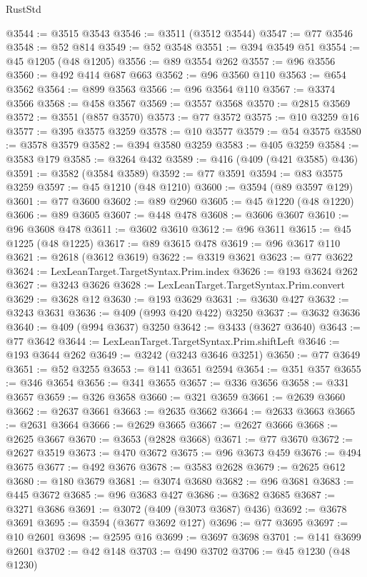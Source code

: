 \begin{lexlean}{RustStd}
\begin{coremodule}
{\begin{coremodule}
{{{{{{{{{{{{{{{{{{{{{{{{{{{{{{{{{{{{{{{{{{{{{{{{{{{{{{{{{{{{@3544 := @3515 @3543
@3546 := @3511 (@3512 @3544)
@3547 := @77 @3546
@3548 := @52 @814
@3549 := @52 @3548
@3551 := @394 @3549 @51
@3554 := @45 @1205 (@48 @1205)
@3556 := @89 @3554 @262
@3557 := @96 @3556
@3560 := @492 @414 @687 @663
@3562 := @96 @3560 @110
@3563 := @654 @3562
@3564 := @899 @3563
@3566 := @96 @3564 @110
@3567 := @3374 @3566
@3568 := @458 @3567
@3569 := @3557 @3568
@3570 := @2815 @3569
@3572 := @3551 (@857 @3570)
@3573 := @77 @3572
@3575 := @10 @3259 @16
@3577 := @395 @3575 @3259
@3578 := @10 @3577
@3579 := @54 @3575
@3580 := @3578 @3579
@3582 := @394 @3580 @3259
@3583 := @405 @3259
@3584 := @3583 @179
@3585 := @3264 @432
@3589 := @416 (@409 (@421 @3585) @436)
@3591 := @3582 (@3584 @3589)
@3592 := @77 @3591
@3594 := @83 @3575 @3259
@3597 := @45 @1210 (@48 @1210)
@3600 := @3594 (@89 @3597 @129)
@3601 := @77 @3600
@3602 := @89 @2960
@3605 := @45 @1220 (@48 @1220)
@3606 := @89 @3605
@3607 := @448 @478
@3608 := @3606 @3607
@3610 := @96 @3608 @478
@3611 := @3602 @3610
@3612 := @96 @3611
@3615 := @45 @1225 (@48 @1225)
@3617 := @89 @3615 @478
@3619 := @96 @3617 @110
@3621 := @2618 (@3612 @3619)
@3622 := @3319 @3621
@3623 := @77 @3622
@3624 := LexLeanTarget.TargetSyntax.Prim.index
@3626 := @193 @3624 @262
@3627 := @3243 @3626
@3628 := LexLeanTarget.TargetSyntax.Prim.convert
@3629 := @3628 @12
@3630 := @193 @3629
@3631 := @3630 @427
@3632 := @3243 @3631
@3636 := @409 (@993 @420 @422) @3250
@3637 := @3632 @3636
@3640 := @409 (@994 @3637) @3250
@3642 := @3433 (@3627 @3640)
@3643 := @77 @3642
@3644 := LexLeanTarget.TargetSyntax.Prim.shiftLeft
@3646 := @193 @3644 @262
@3649 := @3242 (@3243 @3646 @3251)
@3650 := @77 @3649
@3651 := @52 @3255
@3653 := @141 @3651 @2594
@3654 := @351 @357
@3655 := @346 @3654
@3656 := @341 @3655
@3657 := @336 @3656
@3658 := @331 @3657
@3659 := @326 @3658
@3660 := @321 @3659
@3661 := @2639 @3660
@3662 := @2637 @3661
@3663 := @2635 @3662
@3664 := @2633 @3663
@3665 := @2631 @3664
@3666 := @2629 @3665
@3667 := @2627 @3666
@3668 := @2625 @3667
@3670 := @3653 (@2828 @3668)
@3671 := @77 @3670
@3672 := @2627 @3519
@3673 := @470 @3672
@3675 := @96 @3673 @459
@3676 := @494 @3675
@3677 := @492 @3676
@3678 := @3583 @2628
@3679 := @2625 @612
@3680 := @180 @3679
@3681 := @3074 @3680
@3682 := @96 @3681
@3683 := @445 @3672
@3685 := @96 @3683 @427
@3686 := @3682 @3685
@3687 := @3271 @3686
@3691 := @3072 (@409 (@3073 @3687) @436)
@3692 := @3678 @3691
@3695 := @3594 (@3677 @3692 @127)
@3696 := @77 @3695
@3697 := @10 @2601
@3698 := @2595 @16
@3699 := @3697 @3698
@3701 := @141 @3699 @2601
@3702 := @42 @148
@3703 := @490 @3702
@3706 := @45 @1230 (@48 @1230)
}}}}}}}}}}}}}}}}}}}}}}}}}}}}}}}}}}}}}}}}}}}}}}}}}}}}}}}}}}}}
\end{coremodule}}
\end{coremodule}
\end{lexlean}

